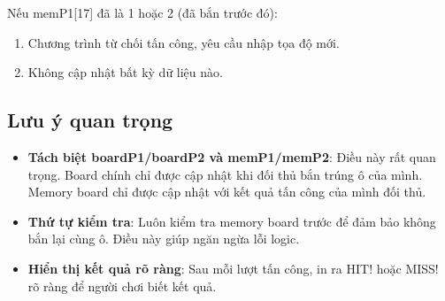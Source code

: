 Nếu memP1[17] đã là 1 hoặc 2 (đã bắn trước đó):
\begin{enumerate}
    \item Chương trình từ chối tấn công, yêu cầu nhập tọa độ mới.
    \item Không cập nhật bất kỳ dữ liệu nào.
\end{enumerate}

\subsection{Lưu ý quan trọng}

\begin{itemize}
    \item \textbf{Tách biệt boardP1/boardP2 và memP1/memP2}: Điều này rất quan trọng. Board chính chỉ được cập nhật khi đối thủ bắn trúng ô của mình. Memory board chỉ được cập nhật với kết quả tấn công của mình đối thủ.
    \item \textbf{Thứ tự kiểm tra}: Luôn kiểm tra memory board trước để đảm bảo không bắn lại cùng ô. Điều này giúp ngăn ngừa lỗi logic.
    \item \textbf{Hiển thị kết quả rõ ràng}: Sau mỗi lượt tấn công, in ra HIT! hoặc MISS! rõ ràng để người chơi biết kết quả.
\end{itemize}
